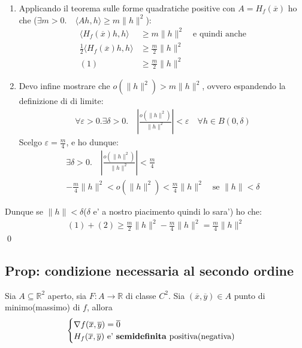 \documentclass{article}
\begin{document}
\begin{enumerate}
  \item Applicando il teorema sulle forme quadratiche positive con
    $A=H_f(\overline{x})$ ho che ($\exists m > 0. \quad \langle A h, h \rangle \geq m \|h\|^2$):
    \begin{align*}
      \langle H_f(\overline{x}) h, h \rangle &\geq m \|h\|^2 \quad \text{e quindi anche} \\
      \frac{1}{2}\langle H_f(\overline{x}) h, h \rangle &\geq \frac{m}{2} \|h\|^2 \\
      (1) &\geq \frac{m}{2} \|h\|^2
    \end{align*}
  \item Devo infine mostrare che $o(\|h\|^2) > m \|h\|^2$, ovvero espandendo la definizione
    di di limite:
    \begin{align*}
      \forall \varepsilon > 0. \exists \delta > 0. \quad |\frac{o(\|h\|^2)}{\|h\|^2}| < \varepsilon
      \quad \forall h \in B(0, \delta)
    \end{align*}
    Scelgo $\varepsilon = \frac{m}{4}$, e ho dunque:
    \begin{align*}
      \exists \delta > 0. \quad |\frac{o(\|h\|^2)}{\|h\|^2}| < \frac{m}{4} \\
      -\frac{m}{4}\|h\|^2 < o(\|h\|^2) < \frac{m}{4}\|h\|^2 \quad \text{se } \|h\| < \delta
    \end{align*}
\end{enumerate}
Dunque se $\|h\| < \delta$($\delta$ e' a nostro piacimento quindi lo sara') ho che:
\begin{align*}
  (1) + (2) \geq \frac{m}{2} \|h\|^2 - \frac{m}{4} \|h\|^2 = \frac{m}{4} \|h\|^2
\end{align*}
\qed

\subsection{Prop: condizione necessaria al secondo ordine}

Sia $A \subseteq \mathbb{R}^2$ aperto, sia $F: A \to \mathbb{R}$ di classe $C^2$.
Sia $(\overline{x}, \overline{y}) \in A$ punto di minimo(massimo) di $f$, allora
\begin{align*}
  \begin{cases}
    \nabla f(\overline{x}, \overline{y}) = \overline{0} \\
    H_f(\overline{x}, \overline{y}) \text{ e' \textbf{semidefinita} positiva(negativa)}
  \end{cases}
\end{align*}
\end{document}
